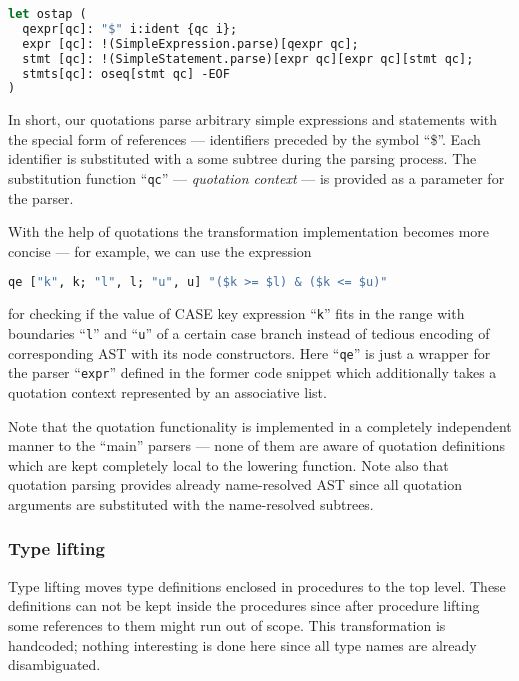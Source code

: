 \begin{lstlisting}[language=ocaml]
let ostap (
  qexpr[qc]: "$" i:ident {qc i};
  expr [qc]: !(SimpleExpression.parse)[qexpr qc];
  stmt [qc]: !(SimpleStatement.parse)[expr qc][expr qc][stmt qc];
  stmts[qc]: oseq[stmt qc] -EOF
)
\end{lstlisting}

In short, our quotations parse arbitrary simple expressions and statements with the special form of
references --- identifiers preceded by the symbol ``\$''. Each identifier is substituted with a
some subtree during the parsing process. The substitution function ``\lstinline{qc}'' --- 
\emph{quotation context} --- is provided as a parameter for the parser. 

With the help of quotations the transformation implementation becomes more concise --- for example, 
we can use the expression

\begin{lstlisting}[language=ocaml]
   qe ["k", k; "l", l; "u", u] "($k >= $l) & ($k <= $u)"
\end{lstlisting}

for checking if the value of CASE key expression ``\lstinline{k}'' fits in the range with boundaries
``\lstinline{l}'' and ``\lstinline{u}'' of a certain case branch instead of tedious encoding of corresponding 
AST with its node constructors. Here ``\lstinline{qe}'' is just a wrapper for the parser ``\lstinline{expr}''
defined in the former code snippet which additionally takes a quotation context represented by an associative 
list.

Note that the quotation functionality is implemented in a completely independent manner to the ``main'' parsers ---
none of them are aware of quotation definitions which are kept completely local to the lowering function. Note also
that quotation parsing provides already name-resolved AST since all quotation arguments are substituted with 
the name-resolved subtrees.

\subsubsection{Type lifting}

Type lifting moves type definitions enclosed in procedures to the top level. These definitions can not be
kept inside the procedures since after procedure lifting some references to them might run out
of scope. This transformation is handcoded; nothing interesting is done here since all type names are 
already disambiguated.


